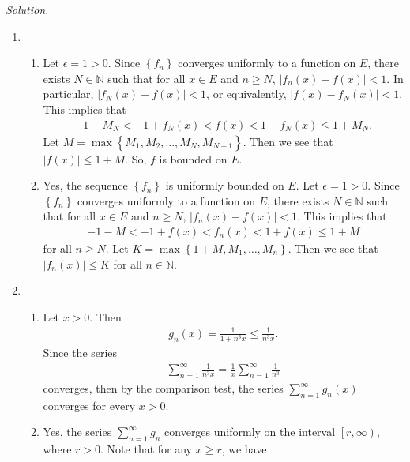 \documentclass[11pt]{amsart}
\theoremstyle{plain}
\numberwithin{equation}{section}
\begin{document}
\noindent\emph{Solution.}
\begin{enumerate}[label=\textbf{(\alph*)}]
    \itemsep 0em
    \item \begin{enumerate}[label=\textbf{(\roman*)}]
        \itemsep 0em
        \item Let $\epsilon=1>0$. Since $\left\{f_{n}\right\}$ converges uniformly to a function on $E$, there exists $N\in\mathbb{N}$ such that for all $x\in E$ and $n\geq N$, $\left|f_{n}(x)-f(x)\right|<1$. In particular, $\left|f_{N}(x)-f(x)\right|<1$, or equivalently, $\left|f\left(x\right)-f_N\left(x\right)\right|<1$. This implies that 
\begin{align*}
    -1-M_{N}<-1+f_{N}(x)<f(x)<1+f_{N}(x)\leq 1+M_{N}.
\end{align*}
Let $M=\max\left\{M_{1},M_{2},\dots,M_{N},M_{N+1}\right\}$. Then we see that $\left|f(x)\right|\leq 1+M$. So, $f$ is bounded on $E$. 
\item Yes, the sequence $\left\{f_{n}\right\}$ is uniformly bounded on $E$. Let $\epsilon=1>0$. Since $\left\{f_{n}\right\}$ converges uniformly to a function on $E$, there exists $N\in\mathbb{N}$ such that for all $x\in E$ and $n\geq N$, $\left|f_{n}(x)-f(x)\right|<1$. This implies that 
\begin{align*}
    -1-M<-1+f(x)<f_{n}(x)<1+f(x)\leq 1+M
\end{align*}
for all $n\geq N$. Let $K=\max\left\{1+M,M_{1},\dots,M_{n}\right\}$. Then we see that $\left|f_{n}(x)\right|\leq K$ for all $n\in\mathbb{N}$.
    \end{enumerate}
    \item \begin{enumerate}[label=\textbf{(\roman*)}]
        \itemsep 0em
        \item Let $x>0$. Then 
\begin{align*}
    g_{n}(x)=\frac{1}{1+n^{3}x}\leq\frac{1}{n^{3}x}.
\end{align*}
Since the series
\begin{align*}
    \sum_{n=1}^{\infty}\frac{1}{n^{3}x}=\frac{1}{x}\sum_{n=1}^{\infty}\frac{1}{n^{3}}
\end{align*}
converges, then by the comparison test, the series $\sum_{n=1}^{\infty}g_{n}(x)$ converges for every $x>0$.
\item Yes, the series $\sum_{n=1}^{\infty}g_{n}$ converges uniformly on the interval $\left[r,\infty\right)$, where $r>0$. Note that for any $x\geq r$, we have
\begin{align*}

\end{align*}
\end{enumerate}
\end{enumerate}
\end{document}
